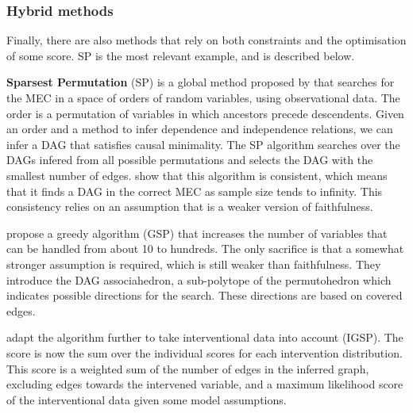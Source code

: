 \subsubsection{Hybrid methods}

Finally, there are also methods that rely on both constraints and the optimisation of some score. SP is the most relevant example, and is described below.

\textbf{Sparsest Permutation} (SP) is a global method proposed by \citet{raskutti2018learning} that searches for the MEC in a space of orders of random variables, using observational data. The order is a permutation of variables in which ancestors precede descendents. Given an order and a method to infer dependence and independence relations, we can infer a DAG that satisfies causal minimality. The SP algorithm searches over the DAGs infered from all possible permutations and selects the DAG with the smallest number of edges. \citet{raskutti2018learning} show that this algorithm is consistent, which means that it finds a DAG in the correct MEC as sample size tends to infinity. This consistency relies on an assumption that is a weaker version of faithfulness. 

\citet{solus2017consistency} propose a greedy algorithm (GSP) that increases the number of variables that can be handled from about 10 to hundreds. The only sacrifice is that a somewhat stronger assumption is required, which is still weaker than faithfulness. They introduce the DAG associahedron, a sub-polytope of the permutohedron which indicates possible directions for the search. These directions are based on covered edges. 

\citet{wang2017permutation} adapt the algorithm further to take interventional data into account (IGSP). The score is now the sum over the individual scores for each intervention distribution. This score is a weighted sum of the number of edges in the inferred graph, excluding edges towards the intervened variable, and a maximum likelihood score of the interventional data given some model assumptions.






